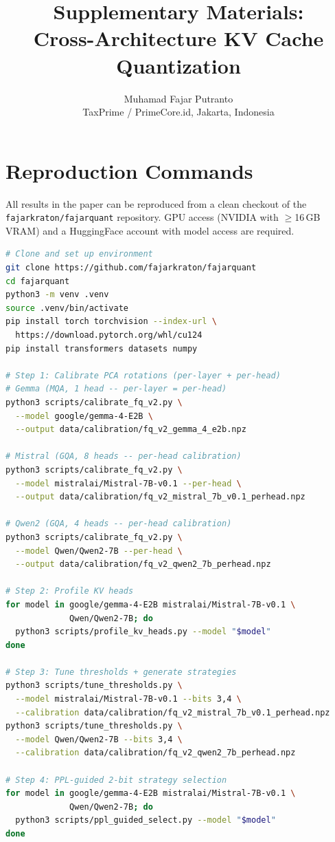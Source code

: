 \documentclass[10pt]{article}
\title{Supplementary Materials:\\Cross-Architecture KV Cache Quantization}
\author{Muhamad Fajar Putranto\\TaxPrime / PrimeCore.id, Jakarta, Indonesia}
\date{}
\begin{document}
\maketitle

\section{Reproduction Commands}
\label{sec:reprod}

All results in the paper can be reproduced from a clean checkout of the
\texttt{fajarkraton/fajarquant} repository. GPU access (NVIDIA with
$\geq$16\,GB VRAM) and a HuggingFace account with model access are
required.

\begin{lstlisting}[language=bash,caption={Full reproduction pipeline}]
# Clone and set up environment
git clone https://github.com/fajarkraton/fajarquant
cd fajarquant
python3 -m venv .venv
source .venv/bin/activate
pip install torch torchvision --index-url \
  https://download.pytorch.org/whl/cu124
pip install transformers datasets numpy

# Step 1: Calibrate PCA rotations (per-layer + per-head)
# Gemma (MQA, 1 head -- per-layer = per-head)
python3 scripts/calibrate_fq_v2.py \
  --model google/gemma-4-E2B \
  --output data/calibration/fq_v2_gemma_4_e2b.npz

# Mistral (GQA, 8 heads -- per-head calibration)
python3 scripts/calibrate_fq_v2.py \
  --model mistralai/Mistral-7B-v0.1 --per-head \
  --output data/calibration/fq_v2_mistral_7b_v0.1_perhead.npz

# Qwen2 (GQA, 4 heads -- per-head calibration)
python3 scripts/calibrate_fq_v2.py \
  --model Qwen/Qwen2-7B --per-head \
  --output data/calibration/fq_v2_qwen2_7b_perhead.npz

# Step 2: Profile KV heads
for model in google/gemma-4-E2B mistralai/Mistral-7B-v0.1 \
             Qwen/Qwen2-7B; do
  python3 scripts/profile_kv_heads.py --model "$model"
done

# Step 3: Tune thresholds + generate strategies
python3 scripts/tune_thresholds.py \
  --model mistralai/Mistral-7B-v0.1 --bits 3,4 \
  --calibration data/calibration/fq_v2_mistral_7b_v0.1_perhead.npz
python3 scripts/tune_thresholds.py \
  --model Qwen/Qwen2-7B --bits 3,4 \
  --calibration data/calibration/fq_v2_qwen2_7b_perhead.npz

# Step 4: PPL-guided 2-bit strategy selection
for model in google/gemma-4-E2B mistralai/Mistral-7B-v0.1 \
             Qwen/Qwen2-7B; do
  python3 scripts/ppl_guided_select.py --model "$model"
done


\end{lstlisting}
\end{document}
